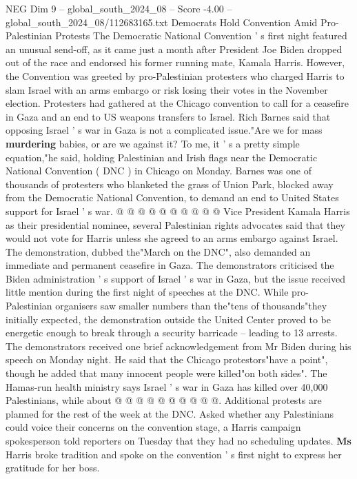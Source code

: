 \begin{textsample}{NEG Dim 9 – global\_south\_2024\_08 – Score -4.00 – global\_south\_2024\_08/112683165.txt}  \label{ex:f9_neg_386}
Democrats Hold Convention Amid Pro-Palestinian Protests The Democratic National Convention ' s first night featured an unusual send-off, as it came just a month after President Joe Biden dropped out of the race and endorsed his former running mate, Kamala Harris.
However, the Convention was greeted by pro-Palestinian protesters who charged Harris to slam Israel with an arms embargo or risk losing their votes in the November election.
Protesters had gathered at the Chicago convention to call for a ceasefire in Gaza and an end to US weapons transfers to Israel.
Rich Barnes said that opposing Israel ' s war in Gaza is not a complicated issue."Are we for mass \textbf{murdering} babies, or are we against it?
To me, it ' s a pretty simple equation,"he said, holding Palestinian and Irish flags near the Democratic National Convention ( DNC ) in Chicago on Monday.
Barnes was one of thousands of protesters who blanketed the grass of Union Park, blocked away from the Democratic National Convention, to demand an end to United States support for Israel ' s war. @ @ @ @ @ @ @ @ @ @ Vice President Kamala Harris as their presidential nominee, several Palestinian rights advocates said that they would not vote for Harris unless she agreed to an arms embargo against Israel.
The demonstration, dubbed the"March on the DNC", also demanded an immediate and permanent ceasefire in Gaza.
The demonstrators criticised the Biden administration ' s support of Israel ' s war in Gaza, but the issue received little mention during the first night of speeches at the DNC.
While pro-Palestinian organisers saw smaller numbers than the"tens of thousands"they initially expected, the demonstration outside the United Center proved to be energetic enough to break through a security barricade -- leading to 13 arrests.
The demonstrators received one brief acknowledgement from Mr Biden during his speech on Monday night.
He said that the Chicago protestors"have a point", though he added that many innocent people were killed"on both sides".
The Hamas-run health ministry says Israel ' s war in Gaza has killed over 40,000 Palestinians, while about @ @ @ @ @ @ @ @ @ @.
Additional protests are planned for the rest of the week at the DNC.
Asked whether any Palestinians could voice their concerns on the convention stage, a Harris campaign spokesperson told reporters on Tuesday that they had no scheduling updates. \textbf{Ms} Harris broke tradition and spoke on the convention ' s first night to express her gratitude for her boss.

\end{textsample}
